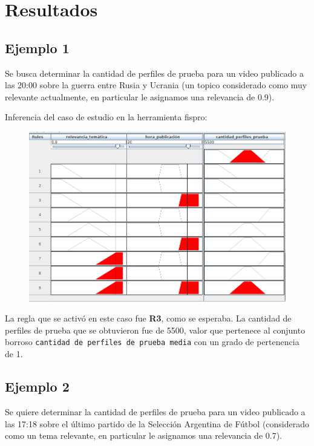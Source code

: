 \documentclass{article}
\begin{document}
\section{Resultados}

\subsection*{Ejemplo 1}

Se busca determinar la cantidad de perfiles de prueba para un video publicado a las 20:00 sobre la guerra entre Rusia y Ucrania (un topico considerado como muy relevante actualmente, en particular le asignamos una relevancia de 0.9).

Inferencia del caso de estudio en la herramienta fispro:
\begin{figure}[H]
	\centering
	\includegraphics*[scale=0.35]{./Images/p1.png}
\end{figure}

La regla que se activó en este caso fue \textbf{R3}, como se esperaba. La cantidad de perfiles de prueba que se obtuvieron fue de 5500, valor que pertenece al conjunto borroso \verb|cantidad de perfiles de prueba media| con un grado de pertenencia de 1.

\subsection*{Ejemplo 2}

Se quiere determinar la cantidad de perfiles de prueba para un video publicado a las 17:18 sobre el último partido de la Selección Argentina de Fútbol (considerado como un tema relevante, en particular le asignamos una relevancia de 0.7).
\end{document}
